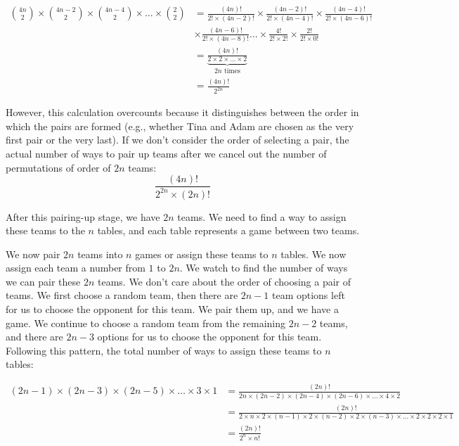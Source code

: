 \documentclass[10pt]{article}
\begin{document}
\begin{enumerate}
\begin{align*}
    \binom{4n}{2} \times \binom{4n-2}{2} \times \binom{4n-4}{2} \times \ldots \times \binom{2}{2} &=\frac{(4n)!}{2! \times (4n - 2)!} \times \frac{(4n-2)!}{2! \times (4n - 4)!} \times \frac{(4n-4)!}{2! \times (4n - 6)!} \\ &\times \frac{(4n-6)!}{2! \times (4n - 8)!} \ldots \times \frac{4!}{2! \times 2!} \times \frac{2!}{2! \times 0!} \\
    &=\underbrace{\frac{(4n)!}{2 \times 2 \times \ldots \times 2}}_\text{$2n$ times} \\
    &=\frac{(4n)!}{2^{2n}} 
\end{align*}

However, this calculation overcounts because it distinguishes between the order in which the pairs are formed (e.g., whether Tina and Adam are chosen as the very first pair or the very last). If we don't consider the order of selecting a pair, the actual number of ways to pair up teams after we cancel out the number of permutations of order of $2n$ teams: $$\frac{(4n)!}{2^{2n} \times (2n)!}$$

After this pairing-up stage, we have $2n$ teams. We need to find a way to assign these teams to the $n$ tables, and each table represents a game between two teams.

We now pair $2n$ teams into $n$ games or assign these teams to $n$ tables. We now assign each team a number from $1$ to $2n$. We watch to find the number of ways we can pair these $2n$ teams. We don't care about the order of choosing a pair of teams. We first choose a random team, then there are $2n-1$ team options left for us to choose the opponent for this team. We pair them up, and we have a game. We continue to choose a random team from the remaining $2n-2$ teams, and there are $2n - 3$ options for us to choose the opponent for this team. Following this pattern, the total number of ways to assign these teams to $n$ tables: 

\begin{align*}
(2n-1)\times (2n-3) \times (2n-5) \times \ldots \times 3 \times 1 &= \frac{(2n)!}{2n \times (2n-2)\times (2n-4) \times (2n-6) \times \ldots \times 4 \times 2} \\
&=\frac{(2n)!}{2 \times n \times 2 \times (n-1) \times 2 \times (n-2) \times 2 \times (n-3) \times \ldots \times 2 \times 2 \times 2 \times 1} \\
&=\frac{(2n)!}{2^n \times n!} \\
\end{align*}


\end{enumerate}
\end{document}
